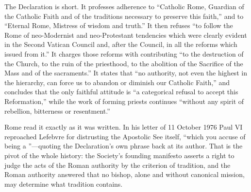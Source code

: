 The Declaration is short. It professes adherence to ``Catholic Rome,
Guardian of the Catholic Faith and of the traditions necessary to
preserve this faith,'' and to ``Eternal Rome, Mistress of wisdom and
truth.'' It then refuses ``to follow the Rome of neo-Modernist and
neo-Protestant tendencies which were clearly evident in the Second
Vatican Council and, after the Council, in all the reforms which issued
from it.'' It charges those reforms with contributing ``to the
destruction of the Church, to the ruin of the priesthood, to the
abolition of the Sacrifice of the Mass and of the sacraments.'' It states
that ``no authority, not even the highest in the hierarchy, can force us
to abandon or diminish our Catholic Faith,'' and concludes that the only
faithful attitude is ``a categorical refusal to accept this Reformation,''
while the work of forming priests continues ``without any spirit of
rebellion, bitterness or resentment.''

Rome read it exactly as it was written. In his letter of 11 October 1976
Paul VI reproached Lefebvre for distrusting the Apostolic See itself,
``which you accuse of being a ''---quoting the Declaration's own phrase back at its
author. That is the pivot of the whole history: the
Society's founding manifesto asserts a right to judge the acts of the
Roman authority by the criterion of tradition, and the Roman authority
answered that no bishop, alone and without canonical mission, may
determine what tradition contains.

